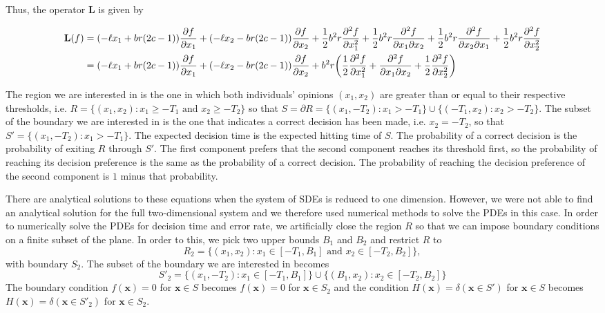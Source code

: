 \documentclass{article}
\newcommand{\mb}{\mathbf}
\begin{document}
Thus, the operator ${\mb L}$ is given by

\begin{align}
{\mb L}(f)&=(-\ell x_1+br(2c-1))\frac{\partial f}{\partial x_1}+(-\ell x_2-br(2c-1))\frac{\partial f}{\partial x_2}+\frac{1}{2}b^2r\frac{\partial^2 f}{\partial x_1^2}+\frac{1}{2}b^2r\frac{\partial^2 f}{\partial x_1\partial x_2}+\frac{1}{2}b^2r\frac{\partial^2 f}{\partial x_2\partial x_1}+\frac{1}{2}b^2r\frac{\partial^2 f}{\partial x_2^2} \notag
\\&=(-\ell x_1+br(2c-1))\frac{\partial f}{\partial x_1}+(-\ell x_2-br(2c-1))\frac{\partial f}{\partial x_2}+b^2r\bigg(\frac{1}{2}\frac{\partial^2 f}{\partial x_1^2}+\frac{\partial^2 f}{\partial x_1\partial x_2}+\frac{1}{2}\frac{\partial^2 f}{\partial x_2^2} \bigg)
\end{align}

The region we are interested in is the one in which both individuals' opinions $(x_1,x_2)$ are greater than or equal to their respective thresholds, i.e. $R=\{(x_1,x_2): x_1\geq -T_1 \text{ and } x_2\geq -T_2\}$ so that $S=\partial R=\{(x_1,-T_2): x_1>-T_1\}\cup\{(-T_1,x_2):x_2>-T_2\}$.  The subset of the boundary we are interested in is the one that indicates a correct decision has been made, i.e. $x_2=-T_2$, so that $S'=\{(x_1,-T_2):x_1>-T_1\}$. The expected decision time is the expected hitting time of $S$. The probability of a correct decision is the probability of exiting $R$ through $S'$. The first component prefers that the second component reaches its threshold first, so the probability of reaching its decision preference is the same as the probability of a correct decision. The probability of reaching the decision preference of the second component is $1$ minus that probability.

There are analytical solutions to these equations when the system of SDEs is reduced to one dimension. However, we were not able to find an analytical solution for the full two-dimensional system and we therefore used numerical methods to solve the PDEs in this case. In order to  numerically solve the PDEs for decision time and error rate, we artificially close the region $R$ so that we can impose boundary conditions on a finite subset of the plane. In order to this, we pick two upper bounds $B_1$ and $B_2$ and restrict $R$ to $$R_2=\{(x_1,x_2): x_1\in [-T_1,B_1] \text{ and } x_2\in[ -T_2,B_2]\},$$ with boundary $S_2$. The subset of the boundary we are interested in becomes 
$$S'_2=\{(x_1,-T_2):x_1\in [-T_1,B_1]\}\cup\{(B_1,x_2):x_2\in [-T_2,B_2]\}$$
The boundary condition $f({\mb x})=0$ for ${\mb x}\in S$ becomes $f({\mb x})=0$ for ${\mb x}\in S_2$ and the condition $H({\mb x})=\delta({\mb x}\in S')$ for ${\mb x}\in S$ becomes $H({\mb x})=\delta({\mb x}\in S'_2)$ for ${\mb x}\in S_2$.
\end{document}
